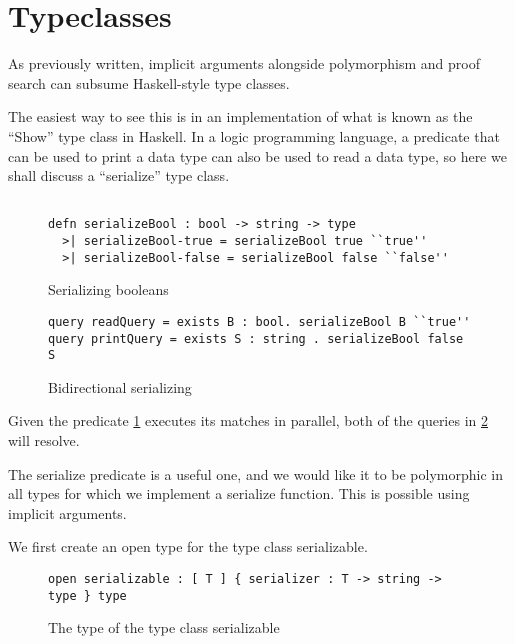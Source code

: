 \section{Typeclasses}


As previously written, implicit arguments alongside polymorphism and proof search can subsume Haskell-style type classes.

The easiest way to see this is in an implementation of what is known as the ``Show'' type class in Haskell.  
In a logic programming language, a predicate that can be used to print a data type can also be used to read a data type, so here we shall discuss a ``serialize'' type class.


\begin{figure}[H]
\begin{lstlisting}

defn serializeBool : bool -> string -> type
  >| serializeBool-true = serializeBool true ``true''
  >| serializeBool-false = serializeBool false ``false''

\end{lstlisting}
\caption{Serializing booleans}
\label{prog:serializing}
\end{figure}



\begin{figure}[H]
\begin{lstlisting}
query readQuery = exists B : bool. serializeBool B ``true''
query printQuery = exists S : string . serializeBool false S
\end{lstlisting}
\caption{Bidirectional serializing}
\label{prog:bidi}
\end{figure}

Given the predicate \ref{prog:serializing} executes its matches in parallel, both of the queries in 
\ref{prog:bidi} will resolve. 

The serialize predicate is a useful one, and we would like it to be polymorphic in all types
for which we implement a serialize function.  This is possible using implicit arguments.

We first create an open type for the type class serializable.

\begin{figure}[H]
\begin{lstlisting}
open serializable : [ T ] { serializer : T -> string -> type } type
\end{lstlisting}
\caption{The type of the type class serializable }
\label{prog:sty}
\end{figure}

